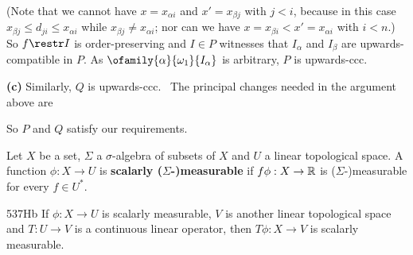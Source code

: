 {

\noindent (Note that we cannot have $x=x_{\alpha i}$ and $x'=x_{\beta j}$
with $j<i$, because in this case $x_{\beta j}\le d_{ji}\le x_{\alpha i}$
while $x_{\beta j}\ne x_{\alpha i}$;  nor can we have
$x=x_{\beta i}<x'=x_{\alpha i}$ with $i<n$.)
So $f\restr I$ is order-preserving and
$I\in P$ witnesses that $I_{\alpha}$ and $I_{\beta}$ are upwards-compatible
in $P$.   As $\ofamily{\alpha}{\omega_1}{I_{\alpha}}$ is arbitrary,
$P$ is upwards-ccc.\ \Qed


{\bf (c)} Similarly, $Q$ is upwards-ccc.   \Prf\ The principal
changes needed in the argument above are


\noindent So $P$ and $Q$ satisfy our requirements.
}%

Let $X$ be a set, $\Sigma$ a $\sigma$-algebra of
subsets of $X$ and $U$ a linear topological space.
A function $\phi:X\to U$ is {\bf scalarly \hbox{($\Sigma$-)}measurable} if
$f\phi:X\to\Bbb R$ is ($\Sigma$-)measurable for every $f\in U^*$.

\spheader 537Hb If $\phi:X\to U$ is scalarly measurable, $V$ is another
linear topological space and $T:U\to V$ is a continuous linear operator,
then
$T\phi:X\to V$ is scalarly measurable.

